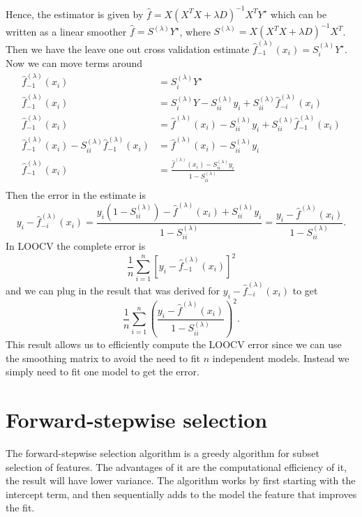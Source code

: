 \documentclass{article}
\begin{document}
Hence, the estimator is given by $\hat{f} = X(X^TX + \lambda D)^{-1}X^TY^\star$ which can be written as a linear smoother $\hat{f} = S^{(\lambda)}Y^\star$, where $S^{(\lambda)} = X(X^TX + \lambda D)^{-1}X^T$. Then we have the leave one out cross validation estimate $\hat{f}_{-1}^{(\lambda)}(x_i) = S_i^{(\lambda)}Y^\star$. Now we can move terms around
\begin{equation}
\begin{split}
\hat{f}_{-1}^{(\lambda)}(x_i) &= S_i^{(\lambda)}Y^\star \\
\hat{f}_{-1}^{(\lambda)}(x_i) & = S_i^{(\lambda)}Y- S_{ii}^{(\lambda)}y_i + S_{ii}^{(\lambda)}\hat{f}_{-i}^{(\lambda)}(x_i) \\  
\hat{f}_{-1}^{(\lambda)}(x_i) & = \hat{f}^{(\lambda)}(x_i) - S_{ii}^{(\lambda)}y_i + S_{ii}^{(\lambda)}\hat{f}_{-1}^{(\lambda)}(x_i) \\
\hat{f}_{-1}^{(\lambda)}(x_i) - S_{ii}^{(\lambda)}\hat{f}_{-1}^{(\lambda)}(x_i) & = \hat{f}^{(\lambda)}(x_i) - S_{ii}^{(\lambda)}y_i \\
\hat{f}_{-1}^{(\lambda)}(x_i) & = \frac{\hat{f}^{(\lambda)}(x_i) - S_{ii}^{(\lambda)}y_i}{1 - S_{ii}^{(\lambda)}} \\
\end{split}
\end{equation}
Then the error in the estimate is
\begin{equation}
y_i - \hat{f}_{-i}^{(\lambda)}(x_i) = \frac{y_i(1 - S_{ii}^{(\lambda)}) - \hat{f}^{(\lambda)}(x_i) + S_{ii}^{(\lambda)}y_i}{1 - S_{ii}^{(\lambda)}} = \frac{y_i - \hat{f}^{(\lambda)}(x_i)}{1 - S_{ii}^{(\lambda)}}.
\end{equation}
In LOOCV the complete error is 
\begin{equation}
\frac{1}{n}\sum_{i=1}^n[y_i - \hat{f}_{-1}^{(\lambda)}(x_i)]^2
\end{equation}
and we can plug in the result that was derived for $y_i - \hat{f}_{-i}^{(\lambda)}(x_i)$ to get 
\begin{equation}
\frac{1}{n}\sum_{i=1}^n(\frac{y_i - \hat{f}^{(\lambda)}(x_i)}{1 - S_{ii}^{(\lambda)}})^2.
\end{equation}
This result allows us to efficiently compute the LOOCV error since we can use the smoothing matrix to avoid the need to fit $n$ independent models. Instead we simply need to fit one model to get the error.
\section{Forward-stepwise selection}
The forward-stepwise selection algorithm is a greedy algorithm for subset selection of features. The advantages of it are the computational efficiency of it, the result will have lower variance. The algorithm works by first starting with the intercept term, and then sequentially adds to the model the feature that improves the fit.
\end{document}
